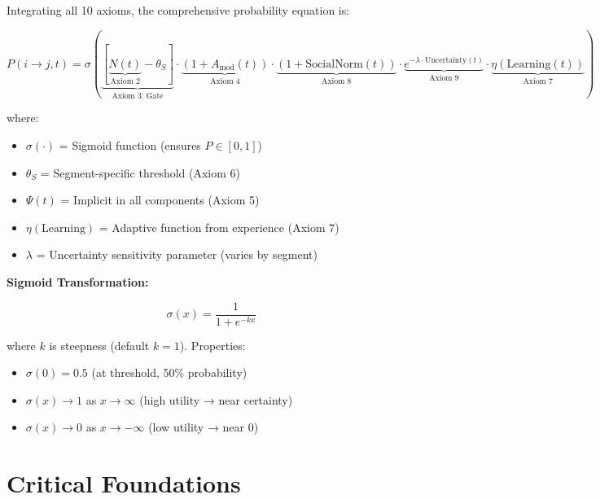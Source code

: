 \documentclass[11pt, a4paper]{article}
\begin{document}
Integrating all 10 axioms, the comprehensive probability equation is:

\begin{equation}
\boxed{
P(i \to j, t) = \sigma\left(
    \underbrace{
        \left[
            \underbrace{N(t)}_{\text{Axiom 2}}
            - \theta_S
        \right]
    }_{\text{Axiom 3: Gate}}
    \cdot
    \underbrace{(1 + A_{\text{mod}}(t))}_{\text{Axiom 4}}
    \cdot
    \underbrace{(1 + \text{SocialNorm}(t))}_{\text{Axiom 8}}
    \cdot
    \underbrace{e^{-\lambda \cdot \text{Uncertainty}(t)}}_{\text{Axiom 9}}
    \cdot
    \underbrace{\eta(\text{Learning}(t))}_{\text{Axiom 7}}
\right)
}
\end{equation}

where:
\begin{itemize}[nosep]
    \item $\sigma(\cdot)$ = Sigmoid function (ensures $P \in [0,1]$)
    \item $\theta_S$ = Segment-specific threshold (Axiom 6)
    \item $\Psi(t)$ = Implicit in all components (Axiom 5)
    \item $\eta(\text{Learning})$ = Adaptive function from experience (Axiom 7)
    \item $\lambda$ = Uncertainty sensitivity parameter (varies by segment)
\end{itemize}

\textbf{Sigmoid Transformation:}

\begin{equation}
\sigma(x) = \frac{1}{1 + e^{-kx}}
\end{equation}

where $k$ is steepness (default $k=1$). Properties:
\begin{itemize}[nosep]
    \item $\sigma(0) = 0.5$ (at threshold, 50\% probability)
    \item $\sigma(x) \to 1$ as $x \to \infty$ (high utility → near certainty)
    \item $\sigma(x) \to 0$ as $x \to -\infty$ (low utility → near 0)
\end{itemize}


\section{Critical Foundations}
\end{document}
